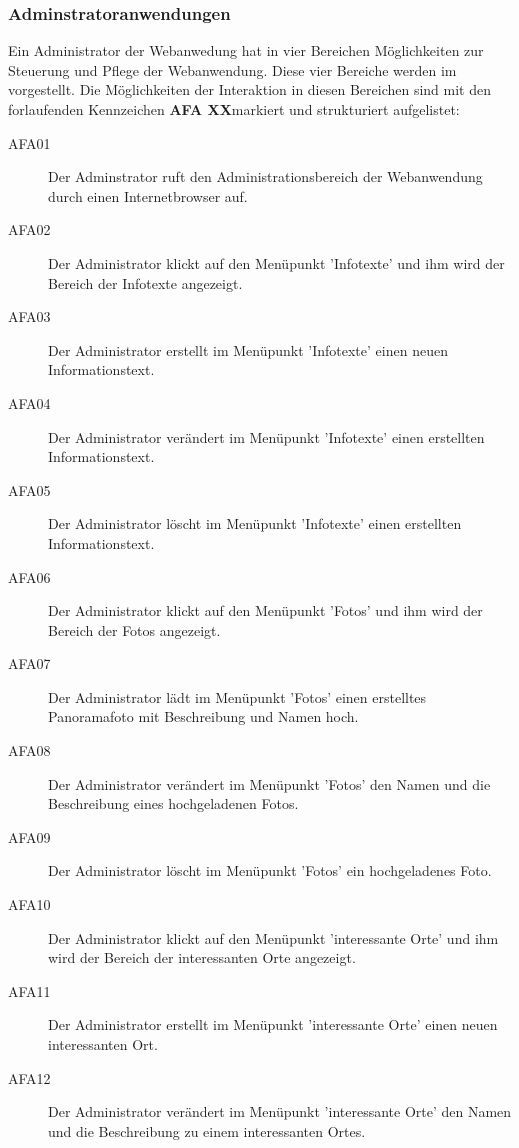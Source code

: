 \subsubsection{Adminstratoranwendungen}
\label{sec:Adminstratoranwendungen}

Ein Administrator der Webanwedung hat in vier Bereichen Möglichkeiten zur Steuerung und Pflege der Webanwendung. Diese vier Bereiche werden im  vorgestellt. Die Möglichkeiten der Interaktion in diesen Bereichen sind mit den forlaufenden Kennzeichen \textbf{AFA XX}\footnotemark markiert und strukturiert aufgelistet:


\begin{description}
  \item[AFA01] Der Adminstrator ruft den Administrationsbereich der Webanwendung durch einen Internetbrowser auf.
  \item[AFA02] Der Administrator klickt auf den Menüpunkt 'Infotexte' und ihm wird der Bereich der Infotexte angezeigt.
  \item[AFA03] Der Administrator erstellt im Menüpunkt 'Infotexte' einen neuen Informationstext.
  \item[AFA04] Der Administrator verändert im Menüpunkt 'Infotexte' einen erstellten Informationstext.
  \item[AFA05] Der Administrator löscht im Menüpunkt 'Infotexte' einen erstellten Informationstext.
  \item[AFA06] Der Administrator klickt auf den Menüpunkt 'Fotos' und ihm wird der Bereich der Fotos angezeigt.
  \item[AFA07] Der Administrator lädt im Menüpunkt 'Fotos' einen erstelltes Panoramafoto mit Beschreibung und Namen hoch.
  \item[AFA08] Der Administrator verändert im Menüpunkt 'Fotos' den Namen und die Beschreibung eines hochgeladenen Fotos.
  \item[AFA09] Der Administrator löscht im Menüpunkt 'Fotos' ein hochgeladenes Foto.
  \item[AFA10] Der Administrator klickt auf den Menüpunkt 'interessante Orte' und ihm wird der Bereich der interessanten Orte angezeigt.
  \item[AFA11] Der Administrator erstellt im Menüpunkt 'interessante Orte' einen neuen interessanten Ort.
  \item[AFA12] Der Administrator verändert im Menüpunkt 'interessante Orte' den Namen und die Beschreibung zu einem interessanten Ortes.

\end{description}
